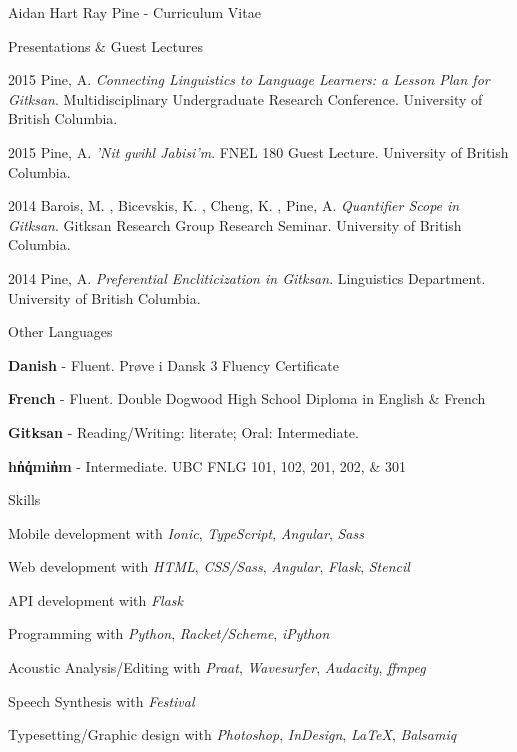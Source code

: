 \documentclass[12pt]{letter}
\begin{document}
\begin{cv}{ Aidan Hart Ray Pine  \space - \space   Curriculum Vitae}
\begin{cvlist}{Presentations \& Guest Lectures}
                    \item[2015]  Pine,  A.   \textit{Connecting Linguistics to Language Learners: a Lesson Plan for Gitksan}. Multidisciplinary Undergraduate Research Conference. University of British Columbia.  
                    \item[2015]  Pine,  A.   \textit{'Nit gwihl Jabisi'm}. FNEL 180 Guest Lecture. University of British Columbia.  
                    \item[2014]  Barois,  M. ,  Bicevskis,  K. ,  Cheng,  K. ,  Pine,  A.   \textit{Quantifier Scope in Gitksan}. Gitksan Research Group Research Seminar. University of British Columbia.  
                    \item[2014]  Pine,  A.   \textit{Preferential Encliticization in Gitksan}. Linguistics Department. University of British Columbia.  
                   
        \end{cvlist}
        \begin{cvlist}{Other Languages}
                            \item \textbf{Danish} - Fluent. Pr{\o}ve i Dansk 3 Fluency Certificate
                            \item \textbf{French} - Fluent. Double Dogwood High School Diploma in English \& French
                            \item \textbf{Gitksan} - Reading/Writing: literate; Oral: Intermediate. 
                            \item \textbf{h{\textschwa}n̓q̓{\textschwa}min̓{\textschwa}m} - Intermediate. UBC FNLG 101, 102, 201, 202, \& 301
                    \end{cvlist}
        
         \begin{cvlist}{Skills}
                        \item Mobile development with  \textit{Ionic},  \textit{TypeScript},  \textit{Angular},  \textit{Sass}                         \item Web development with  \textit{HTML},  \textit{CSS/Sass},  \textit{Angular},  \textit{Flask},  \textit{Stencil}                         \item API development with  \textit{Flask}                         \item Programming with  \textit{Python},  \textit{Racket/Scheme},  \textit{iPython}                         \item Acoustic Analysis/Editing with  \textit{Praat},  \textit{Wavesurfer},  \textit{Audacity},  \textit{ffmpeg}                         \item Speech Synthesis with  \textit{Festival}                         \item Typesetting/Graphic design with  \textit{Photoshop},  \textit{InDesign},  \textit{\LaTeX},  \textit{Balsamiq}                      \end{cvlist}


\end{cv}
\end{document}
